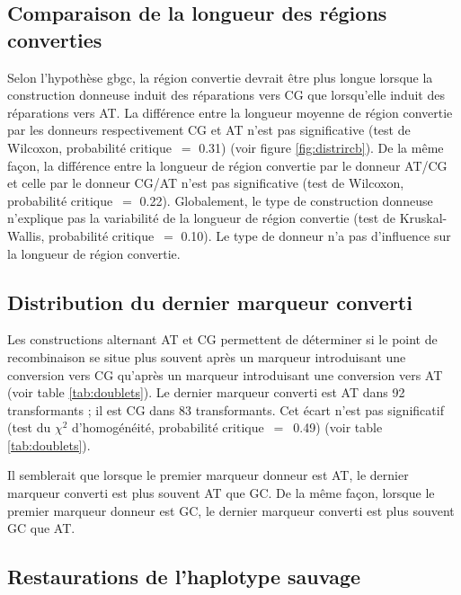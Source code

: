 \subsection{Comparaison de la longueur des régions converties}
\label{subsec:longueur}

Selon l'hypothèse \ac{gbgc}, la région convertie devrait être plus longue
lorsque la construction donneuse induit des réparations vers CG que lorsqu'elle
induit des réparations vers AT. La différence entre la longueur moyenne de
région convertie par les donneurs respectivement CG et AT n'est pas
significative (test de Wilcoxon, probabilité critique~\(=\) \num{0.31}) (voir
figure \ref{fig:distrircb}). De la même façon, la différence entre la longueur
de région convertie par le donneur AT/CG et celle par le donneur CG/AT n'est pas
significative (test de Wilcoxon, probabilité critique~\(=\) \num{0.22}).
Globalement, le type de construction donneuse n'explique pas la variabilité de
la longueur de région convertie (test de Kruskal-Wallis, probabilité
critique~\(=\) \num{0.10}). Le type de donneur n'a pas d'influence sur la
longueur de région convertie.

\subsection{Distribution du dernier marqueur converti}
\label{subsec:distribution-points}

Les constructions alternant AT et CG permettent de déterminer si le point de
recombinaison se situe plus souvent après un marqueur introduisant une
conversion vers CG qu'après un marqueur introduisant une conversion vers AT
(voir table \ref{tab:doublets}). Le dernier marqueur converti est AT dans 92
transformants ; il est CG dans 83 transformants. Cet écart n'est pas significatif
(test du \(\chi^2\) d'homogénéité, probabilité critique~\(=\)~\num{0.49}) (voir
table \ref{tab:doublets}).

Il semblerait que lorsque le premier marqueur donneur est AT, le dernier
marqueur converti est plus souvent AT que GC. De la même façon, lorsque le
premier marqueur donneur est GC, le dernier marqueur converti est plus souvent
GC que AT.


\subsection{Restaurations de l'haplotype sauvage}
\label{subsec:restaur}

